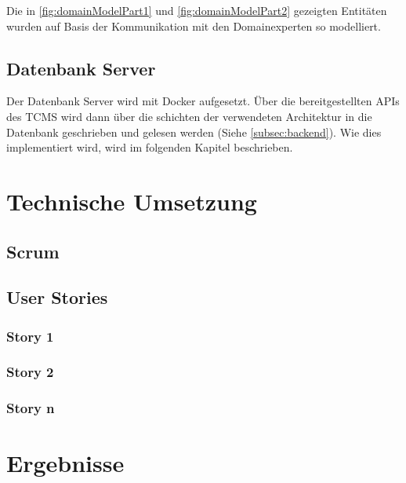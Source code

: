 \documentclass[a4paper, fontsize=11pt, parskip=half, twoside]{scrreprt}
\begin{document}
	Die in \autoref{fig:domainModelPart1} und \autoref{fig:domainModelPart2} gezeigten Entitäten wurden auf Basis der Kommunikation mit den Domainexperten so modelliert.
	
	\section{Datenbank Server}
	Der Datenbank Server wird mit Docker aufgesetzt.
	Über die bereitgestellten \ac{API}s des \ac{TCMS} wird dann über die schichten der verwendeten Architektur in die Datenbank geschrieben und gelesen werden (Siehe \autoref{subsec:backend}).
	Wie dies implementiert wird, wird im folgenden Kapitel beschrieben.
	
	
	\chapter{Technische Umsetzung}


	\section{Scrum}
	\textcite{rubin_essential_2012}
	
	\section{User Stories}
	
	\subsection{Story 1}
	
	\subsection{Story 2}
	
	\subsection{Story n}
	
	
	
	\chapter{Ergebnisse}
	
\end{document}
